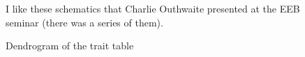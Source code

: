 \documentclass[
]{article}
\begin{document}
\begin{figure}


\caption{\label{fig-outhwaite}I like these schematics that Charlie
Outhwaite presented at the EEB seminar (there was a series of them).}

\end{figure}%

\begin{figure}[H]


\caption{\label{fig-dendo}Dendrogram of the trait table}

\end{figure}%
\end{document}
